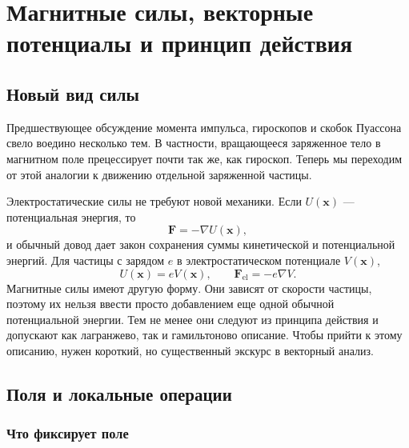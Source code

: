 \chapter{Магнитные силы, векторные потенциалы и принцип действия}


\section{Новый вид силы}

Предшествующее обсуждение момента импульса, гироскопов и скобок Пуассона свело воедино несколько тем. В частности, вращающееся заряженное тело в магнитном поле прецессирует почти так же, как гироскоп. Теперь мы переходим от этой аналогии к движению отдельной заряженной частицы.

Электростатические силы не требуют новой механики. Если \(U(\mathbf x)\) — потенциальная энергия, то
\begin{equation}
  \mathbf F=-\nabla U(\mathbf x),
\end{equation}
и обычный довод дает закон сохранения суммы кинетической и потенциальной энергий. Для частицы с зарядом \(e\) в электростатическом потенциале \(V(\mathbf x)\),
\begin{equation}
  U(\mathbf x)=eV(\mathbf x),
  \qquad
  \mathbf F_{\mathrm{el}}=-e\nabla V.
\end{equation}
Магнитные силы имеют другую форму. Они зависят от скорости частицы, поэтому их нельзя ввести просто добавлением еще одной обычной потенциальной энергии. Тем не менее они следуют из принципа действия и допускают как лагранжево, так и гамильтоново описание. Чтобы прийти к этому описанию, нужен короткий, но существенный экскурс в векторный анализ.

\section{Поля и локальные операции}

\subsection{Что фиксирует поле}

